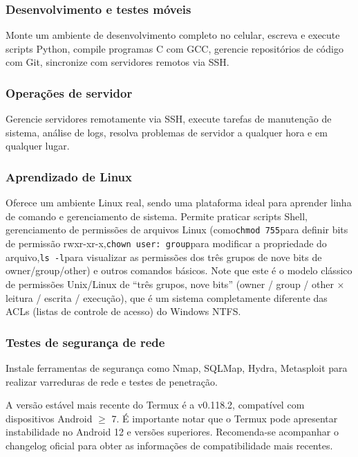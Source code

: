 \subsubsection*{Desenvolvimento e testes móveis}

Monte um ambiente de desenvolvimento completo no celular, escreva e execute scripts Python, compile programas C com GCC, gerencie repositórios de código com Git, sincronize com servidores remotos via SSH.

\subsubsection*{Operações de servidor}

Gerencie servidores remotamente via SSH, execute tarefas de manutenção de sistema, análise de logs, resolva problemas de servidor a qualquer hora e em qualquer lugar.

\subsubsection*{Aprendizado de Linux}

Oferece um ambiente Linux real, sendo uma plataforma ideal para aprender linha de comando e gerenciamento de sistema. Permite praticar scripts Shell, gerenciamento de permissões de arquivos Linux (como\texttt{chmod 755}para definir bits de permissão rwxr-xr-x,\texttt{chown user: group}para modificar a propriedade do arquivo,\texttt{ls -\allowbreak l}para visualizar as permissões dos três grupos de nove bits de owner/group/other) e outros comandos básicos. Note que este é o modelo clássico de permissões Unix/Linux de “três grupos, nove bits” (owner / group / other × leitura / escrita / execução), que é um sistema completamente diferente das ACLs (listas de controle de acesso) do Windows NTFS.

\subsubsection*{Testes de segurança de rede}

Instale ferramentas de segurança como Nmap, SQLMap, Hydra, Metasploit para realizar varreduras de rede e testes de penetração.


A versão estável mais recente do Termux é a v0.118.2, compatível com dispositivos Android $\geq$ 7. É importante notar que o Termux pode apresentar instabilidade no Android 12 e versões superiores. Recomenda-se acompanhar o changelog oficial para obter as informações de compatibilidade mais recentes.

